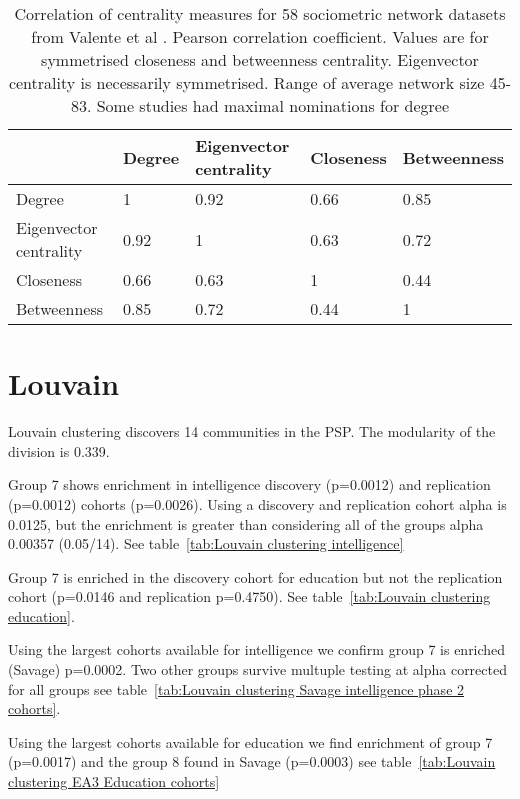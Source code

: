 \begin{table}[]
    \centering
    \begin{tabular}{lllll}
    \toprule
         & Degree & Eigenvector centrality & Closeness & Betweenness \\
         \midrule
    Degree  & 1  & 0.92  & 0.66 & 0.85\\
    Eigenvector centrality & 0.92 & 1 & 0.63 & 0.72  \\
    Closeness & 0.66 & 0.63 & 1 & 0.44  \\
    Betweenness& 0.85 & 0.72 & 0.44 & 1 \\
    \bottomrule
    \end{tabular}
    \caption{Correlation of centrality measures for 58 sociometric network datasets from Valente et al \cite{valente2008correlated}. Pearson correlation coefficient. Values are for symmetrised closeness and betweenness centrality. Eigenvector centrality is necessarily symmetrised. Range of average network size 45-83. Some studies had maximal nominations for degree}
    \label{tab:Correlation of centrality valente et al}
\end{table}


\section{Louvain}

Louvain clustering discovers 14 communities in the PSP. The modularity of the division is 0.339.

Group 7 shows enrichment in intelligence discovery (p=0.0012) and replication (p=0.0012) cohorts (p=0.0026). Using a discovery and replication cohort alpha is 0.0125, but the enrichment is greater than considering all of the groups alpha 0.00357 (0.05/14). See table~\ref{tab:Louvain clustering intelligence}

Group 7 is enriched in the discovery cohort for education but not the replication cohort (p=0.0146 and replication p=0.4750). See table~\ref{tab:Louvain clustering education}.

Using the largest cohorts available for intelligence we confirm group 7 is enriched (Savage) p=0.0002. Two other groups survive multuple testing at alpha corrected for all groups see table~\ref{tab:Louvain clustering Savage intelligence phase 2 cohorts}. 

Using the largest cohorts available for education we find enrichment of group 7 (p=0.0017) and the group 8 found in Savage (p=0.0003) see table~\ref{tab:Louvain clustering EA3 Education cohorts}

